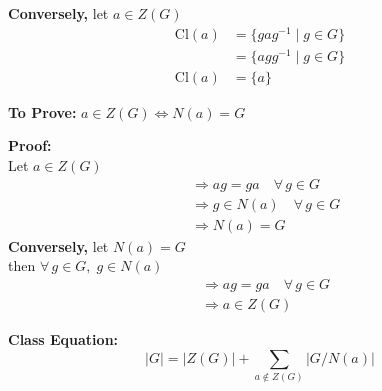 \documentclass[11pt]{article}
\begin{document}
\noindent \textbf{Conversely,} let $a \in Z(G)$
\begin{align*}
\text{Cl}(a) &= \{gag^{-1} \mid g \in G\}  \\
&= \{agg^{-1} \mid g \in G\}  \\
\text{Cl}(a) &= \{a\}
\end{align*}

\bigskip
\noindent \textbf{To Prove:} $a \in Z(G) \iff N(a) = G$

\medskip
\noindent \textbf{Proof:} \\
Let $a \in Z(G)$
\begin{align*}
&\Rightarrow ag = ga \quad \forall\, g \in G  \\
&\Rightarrow g \in N(a) \quad \forall\, g \in G  \\
&\Rightarrow N(a) = G
\end{align*}
\textbf{Conversely,} let $N(a) = G$ \\
then $\forall\, g \in G, \; g \in N(a)$
\begin{align*}
&\Rightarrow ag = ga \quad \forall\, g \in G  \\
&\Rightarrow a \in Z(G)
\end{align*}

\bigskip
\noindent \textbf{Class Equation:}
\[
|G| = |Z(G)| + \sum_{a \notin Z(G)} |G / N(a)|
\]
\end{document}
